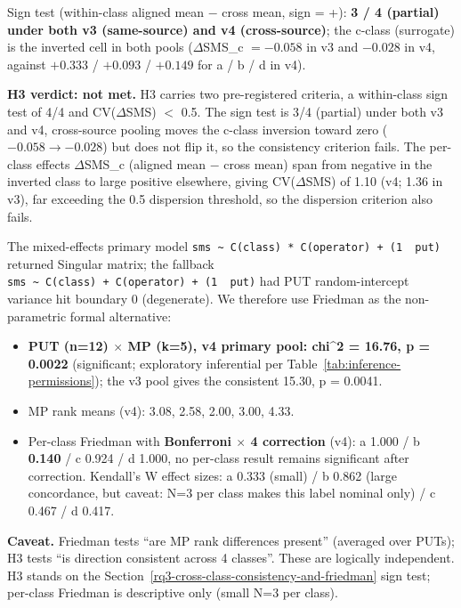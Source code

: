 \documentclass[manuscript,screen,review]{acmart}
\begin{document}
Sign test (within-class aligned mean $-$ cross mean, sign = +): \textbf{3
/ 4 (partial) under both v3 (same-source) and v4 (cross-source)}; the
c-class (surrogate) is the inverted cell in both pools ($\Delta$SMS\_c
$= -0.058$ in v3 and $-0.028$ in v4, against $+0.333$ / $+0.093$ /
$+0.149$ for a / b / d in v4).

\textbf{H3 verdict: not met.} H3 carries two pre-registered criteria, a
within-class sign test of 4/4 and CV($\Delta$SMS) $<$ 0.5. The sign test
is 3/4 (partial) under both v3 and v4, cross-source pooling moves the
c-class inversion toward zero ($-0.058 \to -0.028$) but does not
flip it, so the consistency criterion fails. The
per-class effects $\Delta$SMS\_c (aligned mean $-$ cross mean) span from
negative in the inverted class to large positive elsewhere, giving
CV($\Delta$SMS) of 1.10 (v4; 1.36 in v3), far exceeding the 0.5 dispersion threshold,
so the dispersion criterion also fails.

The mixed-effects primary model
\texttt{sms\ \textasciitilde{}\ C(class)\ *\ C(operator)\ +\ (1\ \textbar{}\ put)}
returned Singular matrix; the fallback
\texttt{sms\ \textasciitilde{}\ C(class)\ +\ C(operator)\ +\ (1\ \textbar{}\ put)}
had PUT random-intercept variance hit boundary 0 (degenerate). We
therefore use Friedman as the non-parametric formal alternative:

\begin{itemize}

\item
  \textbf{PUT (n=12) $\times$ MP (k=5), v4 primary pool: chi\^{}2 = 16.76, p = 0.0022}
  (significant; exploratory inferential per Table~\ref{tab:inference-permissions});
  the v3 pool gives the consistent 15.30, p = 0.0041.
\item
  MP rank means (v4): 3.08, 2.58, 2.00, 3.00, 4.33.
\item
  Per-class Friedman with \textbf{Bonferroni $\times$ 4 correction}
  (v4): a 1.000 / b \textbf{0.140} / c 0.924 / d 1.000, no per-class
  result remains significant after correction. Kendall's W effect sizes:
  a 0.333 (small) / b 0.862 (large concordance, but caveat: N=3 per
  class makes this label nominal only) / c 0.467 / d 0.417.
\end{itemize}

\textbf{Caveat.} Friedman tests ``are MP rank differences present''
(averaged over PUTs); H3 tests ``is direction consistent across 4
classes''. These are logically independent. H3 stands on the Section~\ref{rq3-cross-class-consistency-and-friedman} sign
test; per-class Friedman is descriptive only (small N=3 per class).
\end{document}
